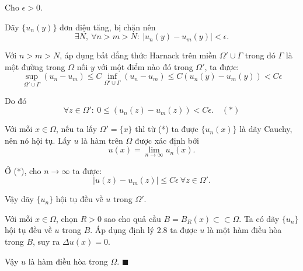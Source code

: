Cho $\epsilon>0$.

Dãy $\{u_n(y)\}$ đơn điệu tăng, bị chặn nên 
\[\exists N,\ \forall n>m>N:\ |u_n(y)-u_m(y)|<\epsilon.\]

Với $n>m>N$, áp dụng bất đẳng thức Harnack trên miền $\Omega'\cup\Gamma$ trong đó $\Gamma$ là một đường trong $\Omega$ nối $y$ với một điểm nào đó trong $\Omega'$, ta được:
\[\sup_{\Omega '\cup \Gamma}(u_{n}-u_{m})\leq C\inf_{\Omega '\cup \Gamma}(u_{n}-u_{m})\leq C(u_{n}(y)-u_{m}(y))< C\epsilon \]

Do đó \[\forall z\in \Omega':\ 0\leq (u_n(z)-u_m(z))< C\epsilon.\quad (*)\]

Với mỗi $x\in\Omega$, nếu ta lấy $\Omega' = \{x\}$ thì từ (*) ta được $\{u_n(x)\}$ là dãy Cauchy, nên nó hội tụ. Lấy $u$ là hàm trên $\Omega$ được xác định bởi 
\[u(x)=\lim_{n\to\infty}u_n(x).\]

Ở (*), cho $n \to \infty $ ta được: 
\[|u(z)-u_m(z)|\leq C\epsilon \ \forall z \in \Omega'.\]

Vậy dãy $\{u_n\}$ hội tụ đều về $u$ trong $\Omega'$.

Với mỗi $x\in\Omega$, chọn $R>0$ sao cho quả cầu $B=B_R(x)\subset\subset\Omega$. Ta có dãy $\{u_n\}$ hội tụ đều về $u$ trong $B$. Áp dụng định lý 2.8 ta được $u$ là một hàm điều hòa trong $B$, suy ra $\Delta u(x)=0$.

Vậy $u$ là hàm điều hòa trong $\Omega$. $\blacksquare$
